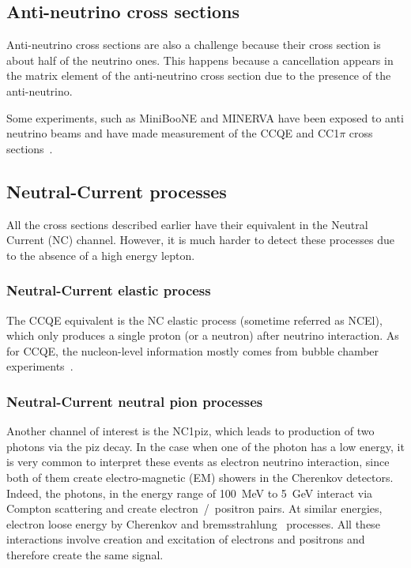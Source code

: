 \subsection{Anti-neutrino cross sections}
Anti-neutrino cross sections are also a challenge because their cross
section is about half of the neutrino ones. This happens because a
cancellation appears in the matrix element of the anti-neutrino cross
section due to the presence of the anti-neutrino.

Some experiments, such as \Gls{MiniBooNE} and \Gls{MINERVA} have been
exposed to anti neutrino beams and have made measurement of the
\Gls{CCQE} and \Gls{CC}1$\pi$ cross
sections~\cite{AguilarArevalo:2013dva,Fields:2013zhk,Aliaga:2015wva}.

\subsection{Neutral-Current processes}
All the cross sections described earlier have their equivalent in the
Neutral Current (\Gls{NC}) channel. However, it is much harder to
detect these processes due to the absence of a high energy lepton.

\subsubsection{Neutral-Current elastic process}
The \Gls{CCQE} equivalent is the \Gls{NC} elastic process (sometime
referred as \Gls{NCEl}), which only produces a single proton (or a
neutron) after neutrino interaction. As for \Gls{CCQE}, the
nucleon-level information mostly comes from bubble chamber
experiments~\cite{Ahrens:1986xe,Garvey:1992cg,Alberico:1998qw}.

\subsubsection{Neutral-Current neutral pion processes}
Another channel of interest is the \Gls{NC}1\gls{piz}, which leads to
production of two photons via the \gls{piz} decay. In the case when
one of the photon has a low energy, it is very common to interpret
these events as electron neutrino interaction, since both of them
create electro-magnetic (\Gls{EM}) showers in the Cherenkov detectors.
Indeed, the photons, in the energy range of 100~MeV to 5~GeV interact
via Compton scattering and create electron~/~positron pairs. At
similar energies, electron loose energy by Cherenkov and
bremsstrahlung~\cite{PDG2014} processes. All these interactions
involve creation and excitation of electrons and positrons and
therefore create the same signal.

